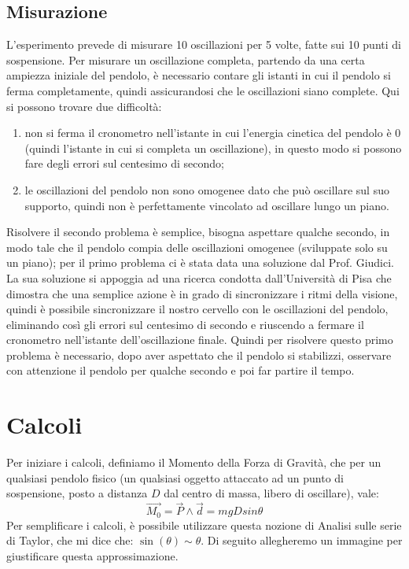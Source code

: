 \documentclass[a4paper]{article}
\begin{document}
    \subsection{Misurazione}
    L'esperimento prevede di misurare 10 oscillazioni per 5 volte, fatte sui 10 punti di sospensione. Per misurare un oscillazione completa, partendo da una certa ampiezza iniziale del pendolo, è necessario contare gli istanti in cui il pendolo si ferma completamente, quindi assicurandosi che le oscillazioni siano complete.
    Qui si possono trovare due difficoltà:
    \begin{enumerate}
        \item non si ferma il cronometro nell'istante in cui l'energia cinetica del pendolo è 0 (quindi l'istante in cui si completa un oscillazione), in questo modo si possono fare degli errori sul centesimo di secondo;
        \item le oscillazioni del pendolo non sono omogenee dato che può oscillare sul suo supporto, quindi non è perfettamente vincolato ad oscillare lungo un piano.
    \end{enumerate}
    
    Risolvere il secondo problema è semplice, bisogna aspettare qualche secondo, in modo tale che il pendolo compia delle oscillazioni omogenee (sviluppate solo su un piano); per il primo problema ci è stata data una soluzione dal Prof. Giudici. La sua soluzione si appoggia ad una ricerca condotta dall'Università di Pisa che dimostra che una semplice azione è in grado di sincronizzare i ritmi della visione, quindi è possibile sincronizzare il nostro cervello con le oscillazioni del pendolo, eliminando così gli errori sul centesimo di secondo e riuscendo a fermare il cronometro nell'istante dell'oscillazione finale. Quindi per risolvere questo primo problema è necessario, dopo aver aspettato che il pendolo si stabilizzi, osservare con attenzione il pendolo per qualche secondo e poi far partire il tempo.
    
    \section{Calcoli}
        Per iniziare i calcoli, definiamo il Momento della Forza di Gravità, che per un qualsiasi pendolo fisico (un qualsiasi oggetto attaccato ad un punto di sospensione, posto a distanza $D$ dal centro di massa, libero di oscillare), vale:
        \begin{equation}\label{eq:1}
            \vec{M_0} = \vec{P} \wedge \vec{d} = m g D sin\theta
        \end{equation}
        Per semplificare i calcoli, è possibile utilizzare questa nozione di Analisi sulle serie di Taylor, che mi dice che: $\sin(\theta) \sim \theta$. Di seguito allegheremo un immagine per giustificare questa approssimazione.
        
\end{document}
